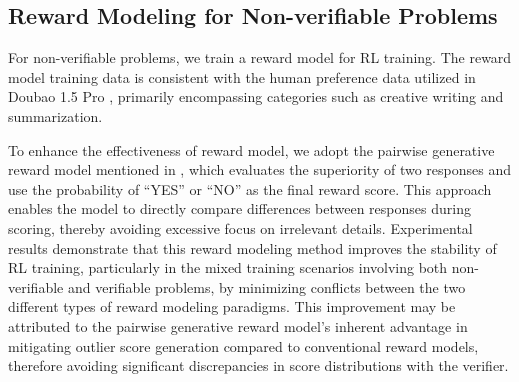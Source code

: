 \subsection{Reward Modeling for Non-verifiable Problems}
For non-verifiable problems, we train a reward model for RL training. The reward model training data is consistent with the human preference data utilized in Doubao 1.5 Pro \citep{doubao1.5pro}, primarily encompassing categories such as creative writing and summarization.

To enhance the effectiveness of reward model, we adopt the pairwise generative reward model mentioned in \cite{qrl}, which evaluates the superiority of two responses and use the probability of ``YES'' or ``NO'' as the final reward score. This approach enables the model to directly compare differences between responses during scoring, thereby avoiding excessive focus on irrelevant details. Experimental results demonstrate that this reward modeling method improves the stability of RL training, particularly in the mixed training scenarios involving both non-verifiable and verifiable problems, by minimizing conflicts between the two different types of reward modeling paradigms. This improvement may be attributed to the pairwise generative reward model's inherent advantage in mitigating outlier score generation compared to conventional reward models, therefore avoiding significant discrepancies in score distributions with the verifier.


\label{sec: sub_reward_model}


